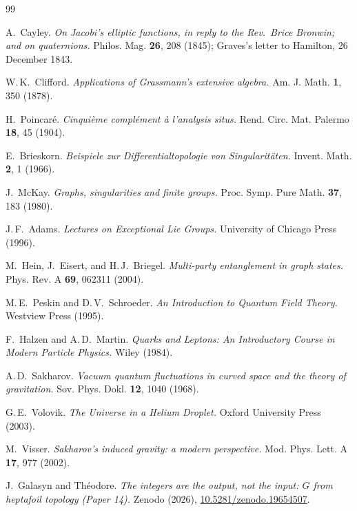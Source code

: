\documentclass[11pt]{article}
\begin{document}
\begin{thebibliography}{99}

  A.~Cayley.
  \emph{On Jacobi's elliptic functions, in reply to the Rev.~Brice
  Bronwin; and on quaternions.}
  Philos. Mag. \textbf{26}, 208 (1845);
  Graves's letter to Hamilton, 26 December 1843.

  W.\,K.~Clifford.
  \emph{Applications of Grassmann's extensive algebra.}
  Am. J. Math. \textbf{1}, 350 (1878).

  H.~Poincar\'e.
  \emph{Cinqui\`eme compl\'ement \`a l'analysis situs.}
  Rend. Circ. Mat. Palermo \textbf{18}, 45 (1904).

  E.~Brieskorn.
  \emph{Beispiele zur Differentialtopologie von Singularit\"aten.}
  Invent. Math. \textbf{2}, 1 (1966).

  J.~McKay.
  \emph{Graphs, singularities and finite groups.}
  Proc. Symp. Pure Math. \textbf{37}, 183 (1980).

  J.\,F.~Adams.
  \emph{Lectures on Exceptional Lie Groups.}
  University of Chicago Press (1996).

  M.~Hein, J.~Eisert, and H.\,J.~Briegel.
  \emph{Multi-party entanglement in graph states.}
  Phys. Rev. A \textbf{69}, 062311 (2004).

  M.\,E.~Peskin and D.\,V.~Schroeder.
  \emph{An Introduction to Quantum Field Theory.}
  Westview Press (1995).

  F.~Halzen and A.\,D.~Martin.
  \emph{Quarks and Leptons: An Introductory Course in Modern
  Particle Physics.}
  Wiley (1984).

  A.\,D.~Sakharov.
  \emph{Vacuum quantum fluctuations in curved space and the theory
  of gravitation.}
  Sov. Phys. Dokl. \textbf{12}, 1040 (1968).

  G.\,E.~Volovik.
  \emph{The Universe in a Helium Droplet.}
  Oxford University Press (2003).

  M.~Visser.
  \emph{Sakharov's induced gravity: a modern perspective.}
  Mod. Phys. Lett. A \textbf{17}, 977 (2002).

  J.~Galasyn and Th\'eodore.
  \emph{The integers are the output, not the input: $G$ from
  heptafoil topology (Paper 14).}
  Zenodo (2026), \href{https://doi.org/10.5281/zenodo.19654507}
  {10.5281/zenodo.19654507}.


\end{thebibliography}
\end{document}
